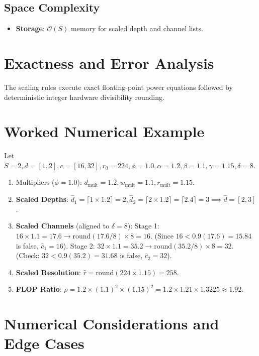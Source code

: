 \documentclass[11pt,a4paper]{article}
\theoremstyle{definition}
\begin{document}
\subsection{Space Complexity}
\begin{itemize}
    \item \textbf{Storage}: $\mathcal{O}(S)$ memory for scaled depth and channel lists.
\end{itemize}

\section{Exactness and Error Analysis}

The scaling rules execute exact floating-point power equations followed by deterministic integer hardware divisibility rounding.

\section{Worked Numerical Example}

Let $S = 2, d = [1, 2], c = [16, 32], r_0 = 224, \phi = 1.0, \alpha = 1.2, \beta = 1.1, \gamma = 1.15, \delta = 8$.

\begin{enumerate}
    \item Multipliers ($\phi = 1.0$):
    $d_{\text{mult}} = 1.2, w_{\text{mult}} = 1.1, r_{\text{mult}} = 1.15$.
    \item \textbf{Scaled Depths}:
    $\hat{d}_1 = \lceil 1 \times 1.2 \rceil = 2, \hat{d}_2 = \lceil 2 \times 1.2 \rceil = \lceil 2.4 \rceil = 3 \implies \hat{d} = [2, 3]$.
    \item \textbf{Scaled Channels} (aligned to $\delta = 8$):
    Stage 1: $16 \times 1.1 = 17.6 \to \text{round}(17.6 / 8) \times 8 = 16$. (Since $16 < 0.9(17.6) = 15.84$ is false, $\hat{c}_1 = 16$).
    Stage 2: $32 \times 1.1 = 35.2 \to \text{round}(35.2 / 8) \times 8 = 32$. (Check: $32 < 0.9(35.2) = 31.68$ is false, $\hat{c}_2 = 32$).
    \item \textbf{Scaled Resolution}:
    $\hat{r} = \text{round}(224 \times 1.15) = 258$.
    \item \textbf{FLOP Ratio}:
    $\rho = 1.2 \times (1.1)^2 \times (1.15)^2 = 1.2 \times 1.21 \times 1.3225 \approx 1.92$.
\end{enumerate}

\section{Numerical Considerations and Edge Cases}
\end{document}
